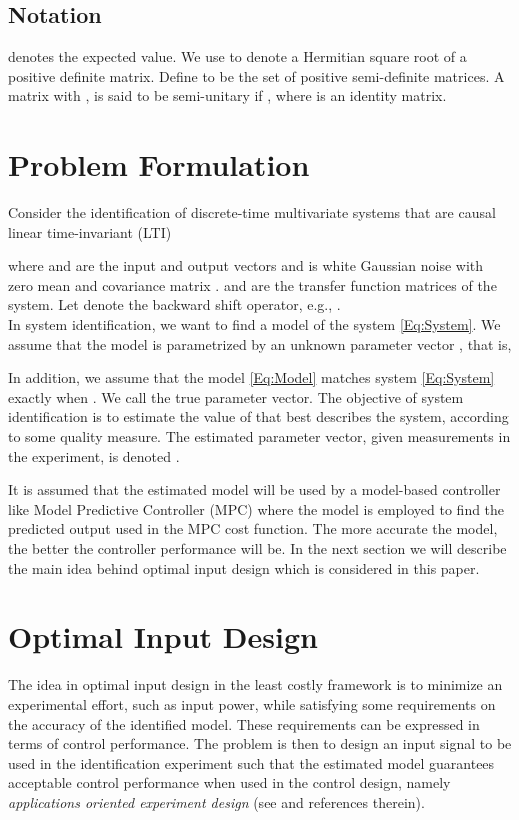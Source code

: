 \documentclass{ifacconf}
\begin{document}
\subsection{Notation}
  denotes the expected value. We use  to denote a Hermitian square root of a positive definite matrix. Define  to be the set of positive  semi-definite matrices. A matrix  with , is said to be semi-unitary if , where  is an  identity matrix.
\section{Problem Formulation}
\label{Sec:Problem Formulation}
Consider the identification of discrete-time multivariate systems that are causal linear time-invariant (LTI)

where  and  are the input and output vectors and  is white Gaussian noise with zero mean and covariance matrix .  and  are the transfer function matrices of the system. Let  denote the backward shift operator, e.g., .
\\
In system identification, we want to find a model of the system \eqref{Eq:System}. We assume that the model is parametrized by an unknown parameter vector , that is,

In addition, we assume that the model \eqref{Eq:Model} matches system \eqref{Eq:System} exactly when . We call  the true parameter vector. The objective of system identification is to estimate the value of  that best describes the system, according to some quality measure. The estimated parameter vector, given  measurements in the experiment, is denoted .

It is assumed that the estimated model will be used by a model-based controller like Model Predictive Controller (MPC) where the model is employed to find the predicted output used in the MPC cost function. The more accurate the model, the better the controller performance will be. In the next section we will describe the main idea behind optimal input design which is considered in this paper.
\section{Optimal Input Design}
\label{Sec:Optimal Input Design}
The idea in optimal input design in the least costly framework is to minimize an experimental effort, such as input power, while satisfying some requirements on the accuracy of the identified model. These requirements can be expressed in terms of control performance. The problem is then to design an input signal to be used in the identification experiment such that the estimated model guarantees acceptable control performance when used in the control design, namely \emph{applications oriented experiment design} (see \cite{Bombois&Gilson:06SYSID} and references therein). 
\end{document}
